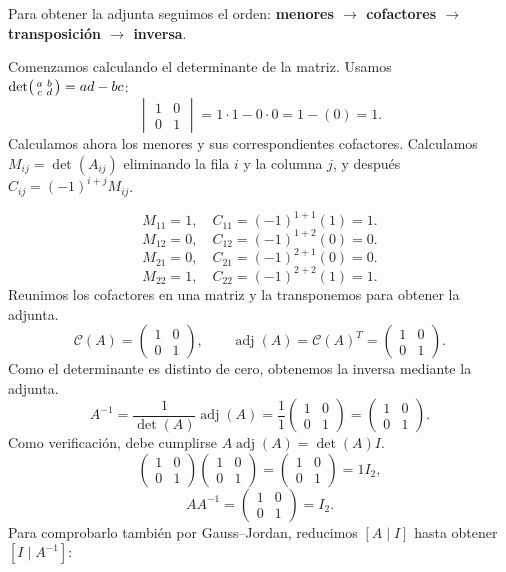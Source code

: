 \documentclass[12pt]{article}
\theoremstyle{remark}
\newcommand{\adj}{\operatorname{adj}}
\begin{document}
Para obtener la adjunta seguimos el orden: \textbf{menores $\to$ cofactores $\to$ transposición $\to$ inversa}.

Comenzamos calculando el determinante de la matriz.
Usamos $\det\begin{psmallmatrix}a&b\\c&d\end{psmallmatrix}=ad-bc$:
\[
\begin{vmatrix}1&0\\0&1\end{vmatrix}=1\cdot 1-0\cdot 0=1-(0)=1.
\]
Calculamos ahora los menores y sus correspondientes cofactores. Calculamos $M_{ij}=\det(A_{ij})$ eliminando la fila $i$ y la columna $j$, y después $C_{ij}=(-1)^{i+j}M_{ij}$.

\[
M_{11}=1,\quad C_{11}=(-1)^{1+1}(1)=1.
\]
\[
M_{12}=0,\quad C_{12}=(-1)^{1+2}(0)=0.
\]
\[
M_{21}=0,\quad C_{21}=(-1)^{2+1}(0)=0.
\]
\[
M_{22}=1,\quad C_{22}=(-1)^{2+2}(1)=1.
\]
Reunimos los cofactores en una matriz y la transponemos para obtener la adjunta.
\[
\mathcal{C}(A)=\begin{pmatrix}1&0\\0&1\end{pmatrix},\qquad\adj(A)=\mathcal{C}(A)^T=\begin{pmatrix}1&0\\0&1\end{pmatrix}.
\]
Como el determinante es distinto de cero, obtenemos la inversa mediante la adjunta.
\[
A^{-1}=\frac1{\det(A)}\adj(A)=\frac1{1}\begin{pmatrix}1&0\\0&1\end{pmatrix}=\begin{pmatrix}1&0\\0&1\end{pmatrix}.
\]
Como verificación, debe cumplirse $A\adj(A)=\det(A)I$.
\[
\begin{pmatrix}1&0\\0&1\end{pmatrix}\begin{pmatrix}1&0\\0&1\end{pmatrix}=\begin{pmatrix}1&0\\0&1\end{pmatrix}=1I_{2},
\]
\[
AA^{-1}=\begin{pmatrix}1&0\\0&1\end{pmatrix}=I_{2}.
\]
Para comprobarlo también por Gauss--Jordan, reducimos $[A\mid I]$ hasta obtener $[I\mid A^{-1}]$:
\end{document}
